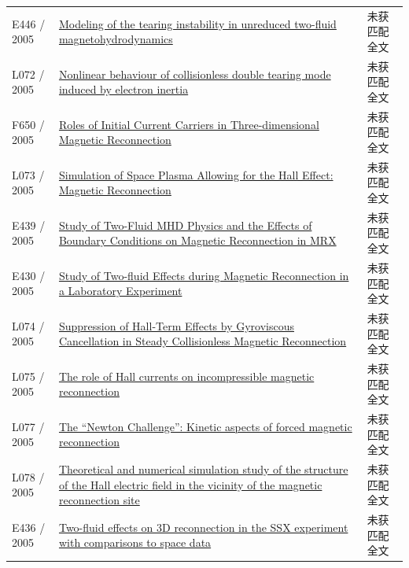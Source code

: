 \documentclass[UTF8,a4paper,11pt,openany,fontset=fandol]{ctexbook}
\begin{document}
\begin{longtable}{P{24mm}P{97mm}P{27mm}}
E446 / 2005 & \href{https://doi.org/10.1134/1.2031627}{Modeling of the tearing instability in unreduced two-fluid magnetohydrodynamics} & 未获匹配全文\\

L072 / 2005 & \href{https://doi.org/10.1088/0029-5515/45/11/006}{Nonlinear behaviour of collisionless double tearing mode induced by electron inertia} & 未获匹配全文\\

F650 / 2005 & \href{http://lucid.igpp.ucla.edu/lessons/ess265/2005/7th-ISSS/CONTENTS/DATA_PDF/P-1-29.PDF}{Roles of Initial Current Carriers in Three-dimensional Magnetic Reconnection} & 未获匹配全文\\

L073 / 2005 & \href{https://doi.org/10.1007/s10598-005-0026-5}{Simulation of Space Plasma Allowing for the Hall Effect: Magnetic Reconnection} & 未获匹配全文\\

E439 / 2005 & \href{http://absimage.aps.org/image/DPP05/MWS_DPP05-2005-001148.pdf}{Study of Two-Fluid MHD Physics and the Effects of Boundary Conditions on Magnetic Reconnection in MRX} & 未获匹配全文\\

E430 / 2005 & \href{https://ui.adsabs.harvard.edu/abs/2005APS..DPPLP1096Y/abstract}{Study of Two-fluid Effects during Magnetic Reconnection in a Laboratory Experiment} & 未获匹配全文\\

L074 / 2005 & \href{https://doi.org/10.1103/physrevlett.95.045003}{Suppression of Hall-Term Effects by Gyroviscous Cancellation in Steady Collisionless Magnetic Reconnection} & 未获匹配全文\\

L075 / 2005 & \href{https://doi.org/10.1016/j.asr.2005.06.054}{The role of Hall currents on incompressible magnetic reconnection} & 未获匹配全文\\

L077 / 2005 & \href{https://doi.org/10.1029/2005ja011228}{The “Newton Challenge”: Kinetic aspects of forced magnetic reconnection} & 未获匹配全文\\

L078 / 2005 & \href{https://doi.org/10.1017/s0022377805003922}{Theoretical and numerical simulation study of the structure of the Hall electric field in the vicinity of the magnetic reconnection site} & 未获匹配全文\\

E436 / 2005 & \href{http://absimage.aps.org/image/DPP05/MWS_DPP05-2005-000619.pdf}{Two-fluid effects on 3D reconnection in the SSX experiment with comparisons to space data} & 未获匹配全文\\


\end{longtable}
\end{document}
